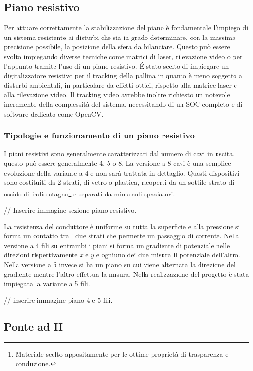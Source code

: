 \documentclass[11pt]{article}
\begin{document}
\subsection{Piano resistivo}\label{pianoresistivo}
Per attuare correttamente la stabilizzazione del piano è fondamentale l'impiego di un sistema resistente ai disturbi che sia in grado determinare, con la massima precisione possibile, la posizione della sfera da bilanciare. Questo può essere svolto impiegando diverse tecniche come matrici di laser, rilevazione video o per l'appunto tramite l'uso di un piano resistivo.
É stato scelto di impiegare un digitalizzatore resistivo per il tracking della pallina in quanto è meno soggetto a disturbi ambientali, in particolare da effetti ottici, rispetto alla matrice laser e alla rilevazione video.
Il tracking video avrebbe inoltre richiesto un notevole incremento della complessità del sistema, necessitando di un SOC completo e di software dedicato come OpenCV.
\subsubsection{Tipologie e funzionamento di un piano resistivo}\label{tipofunz}
I piani resistivi sono generalmente caratterizzati dal numero di cavi in uscita, questo può essere generalmente 4, 5 o 8. La versione a 8 cavi è una semplice evoluzione della variante a 4 e non sarà trattata in dettaglio. Questi dispositivi sono costituiti da 2 strati, di vetro o plastica, ricoperti da un sottile strato di ossido di indio-stagno\footnote{Materiale scelto appositamente per le ottime proprietà di trasparenza e conduzione.} e separati da minuscoli spaziatori. 

// Inserire immagine sezione piano resistivo.

La resistenza del conduttore è uniforme su tutta la superficie e alla pressione si forma un contatto tra i due strati che permette un passaggio di corrente.
Nella versione a 4 fili su entrambi i piani si forma un gradiente di potenziale nelle direzioni rispettivamente \emph{x} e \emph{y} e ogniuno dei due misura il potenziale dell'altro. Nella versione a 5 invece si ha un piano su cui viene alternata la direzione del gradiente mentre l'altro effettua la misura.
Nella realizzazione del progetto è stata impiegata la variante a 5 fili.

// inserire immagine piano 4 e 5 fili.

\subsection{Ponte ad H}\label{hbridge}
\end{document}
